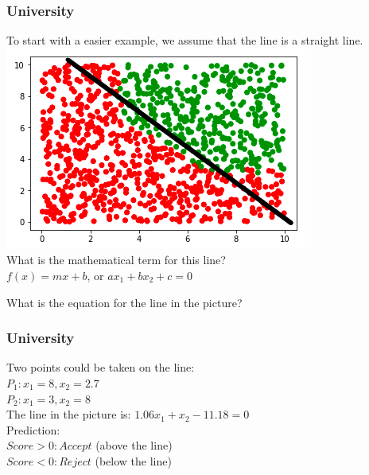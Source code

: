 \begin{frame}[fragile]
  \frametitle{University}
  To start with a easier example, we assume that the line is a straight line.\\
  \vspace{3mm}
  \includegraphics[scale=0.4]{img/uni_data_2}\\
  \vspace{3mm}
  What is the mathematical term for this line?\\
  $f(x)=mx+b$, or $ax_1+bx_2+c=0$\\
  \begin{exercise}
  What is the equation for the line in the picture?
  \end{exercise} 
\end{frame}

\begin{frame}[fragile]
  \frametitle{University}
  Two points could be taken on the line:\\
  $P_1: x_1=8, x_2=2.7$\\
  $P_2: x_1=3, x_2=8$\\
  \vspace{3mm}
  The line in the picture is: $1.06x_1+x_2-11.18=0$\\
  \vspace{3mm}
  Prediction:\\
  $Score > 0: Accept$ (above the line)\\
  $Score < 0: Reject$ (below the line)
\end{frame}

